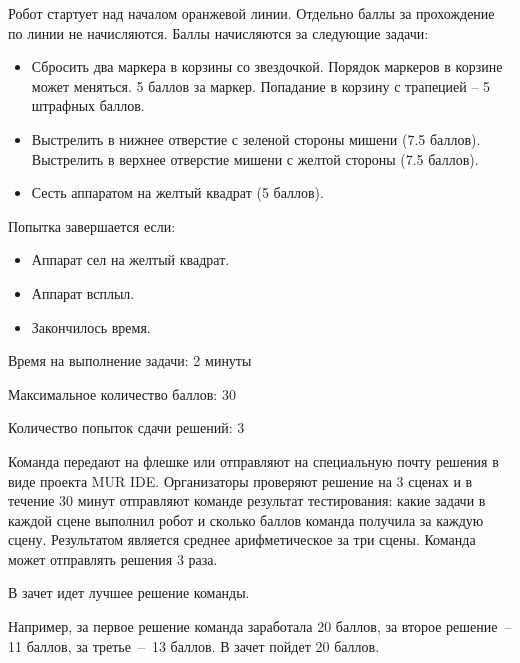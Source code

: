

Робот стартует над началом оранжевой линии. Отдельно баллы за прохождение по линии не начисляются. 
Баллы начисляются за следующие задачи:
\begin{itemize}
    \item Сбросить два маркера в корзины со звездочкой. Порядок маркеров в корзине может меняться. 5 баллов за маркер. Попадание в корзину с трапецией – 5 штрафных баллов. 
    \item Выстрелить в нижнее отверстие с зеленой стороны мишени (7.5 баллов). Выстрелить в верхнее отверстие мишени с желтой стороны (7.5 баллов). 
    \item Сесть аппаратом на желтый квадрат (5 баллов). 
\end{itemize}

Попытка завершается если:
\begin{itemize}
    \item Аппарат сел на желтый квадрат.
    \item Аппарат всплыл.
    \item Закончилось время.
\end{itemize}

Время на выполнение задачи: 2 минуты

Максимальное количество баллов: 30

Количество попыток сдачи решений: 3

\markSection

Команда передают на флешке или отправляют на специальную почту решения в виде проекта MUR IDE. Организаторы проверяют решение на 3 сценах и в течение 30 минут отправляют команде результат тестирования: какие задачи в каждой сцене выполнил робот и сколько баллов команда получила за каждую сцену. Результатом является среднее арифметическое за три сцены. Команда может отправлять решения 3 раза.  

В зачет идет лучшее решение команды. 

Например, за первое решение команда заработала 20 баллов, за второе решение~– 11 баллов, за третье~–~13 баллов. В зачет пойдет 20 баллов.